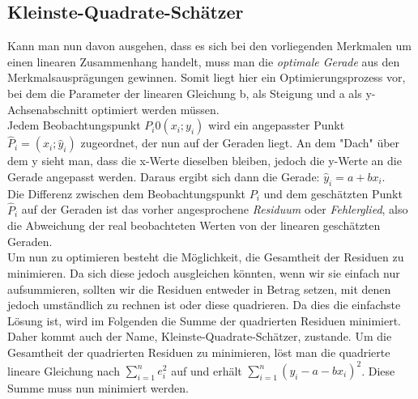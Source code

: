 \documentclass[a4paper]{article}
\begin{document}
\subsection{Kleinste-Quadrate-Schätzer}\label{sec:KQS}
Kann man nun davon ausgehen, dass es sich bei den vorliegenden Merkmalen um einen linearen Zusammenhang handelt, muss man die \textit{optimale Gerade} aus den Merkmalsausprägungen gewinnen. Somit liegt hier ein Optimierungsprozess vor, bei dem die Parameter der linearen Gleichung b, als Steigung und a als y-Achsenabschnitt optimiert werden müssen. \\
Jedem Beobachtungspunkt $P_i0(x_i;y_i)$ wird ein angepasster Punkt $\hat{P}_i=(x_i;\hat{y}_i)$ zugeordnet, der nun auf der Geraden liegt. An dem "Dach" über dem y sieht man, dass die x-Werte dieselben bleiben, jedoch die y-Werte an die Gerade angepasst werden. Daraus ergibt sich dann die Gerade: $\hat{y}_i=a+bx_i$.\\
Die Differenz zwischen dem Beobachtungspunkt $P_i$ und dem geschätzten Punkt $\hat{P}_i$ auf der Geraden ist das vorher angesprochene \textit{Residuum} oder \textit{Fehlerglied}, also die Abweichung der real beobachteten Werten von der linearen geschätzten Geraden.\\
Um nun zu optimieren besteht die Möglichkeit, die Gesamtheit der Residuen zu minimieren. Da sich diese jedoch ausgleichen könnten, wenn wir sie einfach nur aufsummieren, sollten wir die Residuen entweder in Betrag setzen, mit denen jedoch umständlich zu rechnen ist oder diese quadrieren. Da dies die einfachste Lösung ist, wird im Folgenden die Summe der quadrierten Residuen minimiert. Daher kommt auch der Name, Kleinste-Quadrate-Schätzer, zustande. Um die Gesamtheit der quadrierten Residuen zu minimieren, löst man die quadrierte lineare Gleichung nach $\sum_{i=1}^ne_i^{2}$ auf und erhält $\sum_{i=1}^n(y_i-a-bx_i)^{2}$. Diese Summe muss nun minimiert werden.
\end{document}

